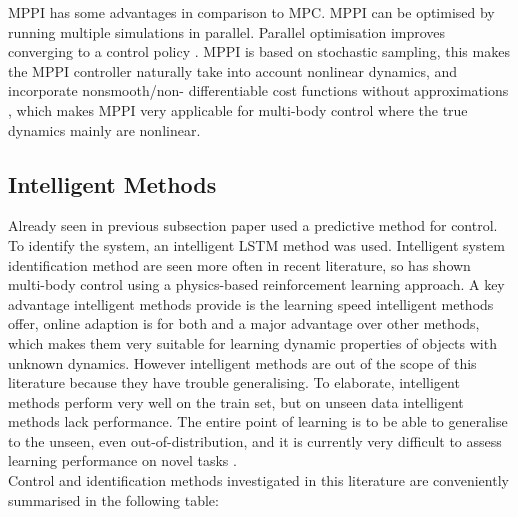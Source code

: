 \ac{MPPI} has some advantages in comparison to \ac{MPC}. \ac{MPPI} can be optimised by running multiple simulations in parallel. Parallel optimisation improves converging to a control policy \cite{williams_model_2017}. \ac{MPPI} is based on stochastic sampling, this makes the \ac{MPPI} controller naturally take into account nonlinear dynamics, and incorporate nonsmooth/non- differentiable cost functions without approximations \cite{williams_model_2015}, which makes \ac{MPPI} very applicable for multi-body control where the true dynamics mainly are nonlinear. \\ 

\subsection{Intelligent Methods}
\label{subsection: intelligent_methods}
Already seen in previous subsection paper \cite{cong_self-adapting_2020} used a predictive method for control. To identify the system, an intelligent \ac{LSTM} method was used. Intelligent system identification method are seen more often in recent literature, so has \cite{scholz_learning_2015} shown multi-body control using a physics-based reinforcement learning approach. A key advantage intelligent methods provide is the learning speed intelligent methods offer, online adaption is for both \cite{cong_self-adapting_2020} and \cite{scholz_learning_2015} a major advantage over other methods, which makes them very suitable for learning dynamic properties of objects with unknown dynamics. However intelligent methods are out of the scope of this literature because they have trouble generalising. To elaborate, intelligent methods perform very well on the train set, but on unseen data intelligent methods lack performance. The entire point of learning is to be able to generalise to the unseen, even out-of-distribution, and it is currently very difficult to assess learning performance on novel tasks \cite{roy_machine_2021}.\\

Control and identification methods investigated in this literature are conveniently summarised in the following table:

